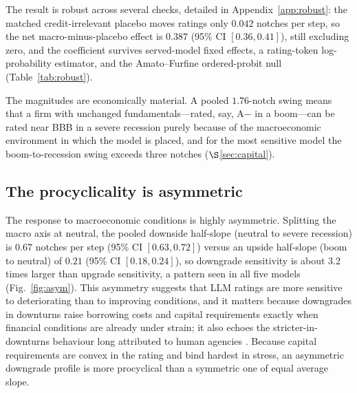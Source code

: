 \documentclass[a4paper,fleqn]{cas-sc}
\begin{document}
The result is robust across several checks, detailed in Appendix~\ref{app:robust}: the matched
credit-irrelevant placebo moves ratings only $0.042$ notches per step, so the net macro-minus-placebo
effect is $0.387$ (95\% CI $[0.36,0.41]$), still excluding zero, and the coefficient survives
served-model fixed effects, a rating-token log-probability estimator, and the Amato--Furfine
ordered-probit null (Table~\ref{tab:robust}).

The magnitudes are economically material. A pooled $1.76$-notch swing means that a firm with unchanged
fundamentals---rated, say, A$-$ in a boom---can be rated near BBB in a severe recession purely because
of the macroeconomic environment in which the model is placed, and for the most sensitive model the
boom-to-recession swing exceeds three notches ($\S$\ref{sec:capital}).

\subsection{The procyclicality is asymmetric}\label{sec:asym}
The response to macroeconomic conditions is highly asymmetric. Splitting the macro axis at neutral,
the pooled downside half-slope (neutral to severe recession) is $0.67$ notches per step (95\% CI
$[0.63,0.72]$) versus an upside half-slope (boom to neutral) of $0.21$ (95\% CI $[0.18,0.24]$), so
downgrade sensitivity is about $3.2$ times larger than upgrade sensitivity, a pattern seen in all five
models (Fig.~\ref{fig:asym}). This asymmetry suggests that LLM ratings are
more sensitive to deteriorating than to improving conditions, and it matters because downgrades in
downturns raise borrowing costs and capital requirements exactly when financial conditions are already
under strain; it also echoes the stricter-in-downturns behaviour long attributed to human agencies
\citep{loffler2004}. Because capital requirements are convex in the rating and bind hardest in stress,
an asymmetric downgrade profile is more procyclical than a symmetric one of equal average slope.
\end{document}
